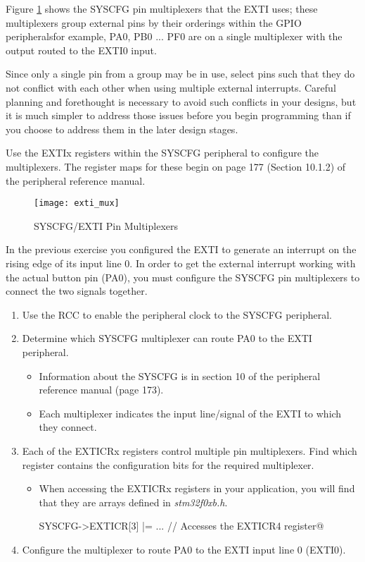 \documentclass[openany,11pt,fleqn]{book} %
\makeatletter
\newcommand{\ilcode}[1]{
    \smallskip
    \colorbox{gray!20!white}{
        \centering
        \parbox{\linewidth-2\fboxsep}{
            \lstinline@#1@
        }
    }
}
\makeatother
\begin{document}
Figure \ref{exti_mux} shows the SYSCFG pin multiplexers that the EXTI uses; these multiplexers group external pins by their orderings within the GPIO peripherals\textemdash for example, PA0, PB0 ... PF0 are on a single multiplexer with the output routed to the EXTI0 input. 

\begin{warning}Since only a single pin from a group may be in use, select pins such that they do not conflict with each other when using multiple external interrupts. Careful planning and forethought is necessary to avoid such conflicts in your designs, but it is much simpler to address those issues before you begin programming than if you choose to address them in the later design stages.
\end{warning}

Use the EXTIx registers within the SYSCFG peripheral to configure the multiplexers. The register maps for these begin on page 177 (Section 10.1.2) of the peripheral reference manual. 

\begin{figure}[]
    \centering\texttt{[image: exti\_mux]}
    \caption{SYSCFG/EXTI Pin Multiplexers}
    \label{exti_mux}
\end{figure}

\begin{exercise}
    \label{ex3}
    In the previous exercise you configured the EXTI to generate an interrupt on the rising edge of its input line 0. In order to get the external interrupt working with the actual button pin (PA0), you must configure the SYSCFG pin multiplexers to connect the two signals together. 
    \begin{enumerate}
        \item Use the RCC to enable the peripheral clock to the SYSCFG peripheral.
        \item Determine which SYSCFG multiplexer can route PA0 to the EXTI peripheral.
        \begin{itemize}
            \item Information about the SYSCFG is in section 10 of the peripheral reference manual (page 173).
            \item Each multiplexer indicates the input line/signal of the EXTI to which they connect.
        \end{itemize}
        \item Each of the EXTICRx registers control multiple pin multiplexers. Find which register contains the configuration bits for the required multiplexer. 
        \begin{itemize}
        	\item When accessing the EXTICRx registers in your application, you will find that they are arrays defined in \textit{stm32f0xb.h}. \\
        	\ilcode{SYSCFG->EXTICR[3] |= ...   // Accesses the EXTICR4 register}
        \end{itemize} 
        \item Configure the multiplexer to route PA0 to the EXTI input line 0 (EXTI0).
    \end{enumerate}
\end{exercise}
\end{document}
